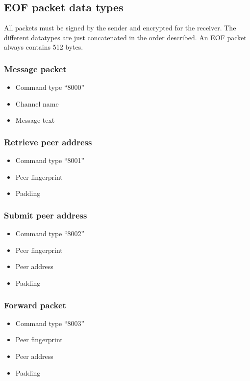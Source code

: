 \documentclass[12pt,a4paper]{book}
\begin{document}
\subsection{EOF packet data types}
All packets must be signed by the sender and encrypted for the receiver.
The different datatypes are just concatenated in the order
described.
An EOF packet always contains 512 bytes.
\subsubsection{Message packet}
\begin{itemize}
\item Command type "`8000"'
\item Channel name
\item Message text
\end{itemize}
\subsubsection{Retrieve peer address}
\begin{itemize}
\item Command type "`8001"'
\item Peer fingerprint
\item Padding
\end{itemize}
\subsubsection{Submit peer address}
\begin{itemize}
\item Command type "`8002"'
\item Peer fingerprint
\item Peer address
\item Padding
\end{itemize}
\subsubsection{Forward packet}
\begin{itemize}
\item Command type "`8003"'
\item Peer fingerprint
\item Peer address
\item Padding
\end{itemize}
\end{document}
